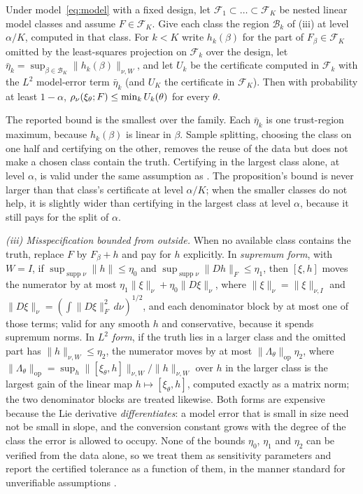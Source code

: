 \begin{proposition}
\label{prop:classes}
Under model~\eqref{eq:model} with a fixed design, let $\mathcal F_1 \subset
\dots \subset \mathcal F_K$ be nested linear model classes and assume $F \in
\mathcal F_K$. Give each class the region $\mathcal B_k$ of
(iii) at level $\alpha/K$, computed in that class. For $k < K$ write $h_k(\beta)$ for the part
of $F_\beta \in \mathcal F_K$ omitted by the least-squares projection on
$\mathcal F_k$ over the design, let $\bar\eta_k = \sup_{\beta \in \mathcal B_K}
\|h_k(\beta)\|_{\nu,W}$, and let $U_k$ be the certificate computed in
$\mathcal F_k$ with the $L^2$ model-error term $\bar\eta_k$ (and $U_K$ the
certificate in $\mathcal F_K$). Then with probability at least $1-\alpha$,
$\rho_\nu(\xi_\theta;F) \le \min_k U_k(\theta)$ for every $\theta$.
\end{proposition}

The reported bound is the smallest over the family. Each $\bar\eta_k$ is one
trust-region maximum, because $h_k(\beta)$ is linear in $\beta$. Sample
splitting, choosing the class on one half and certifying on the other, removes
the reuse of the data but does not make a chosen class contain the truth.
Certifying in the largest class alone, at level $\alpha$, is valid under the
same assumption as . The proposition's bound is never larger
than that class's certificate at level $\alpha/K$; when the smaller classes do
not help, it is slightly wider than certifying in the largest class at level
$\alpha$, because it still pays for the split of $\alpha$.

\emph{(iii) Misspecification bounded from outside.} When no available class
contains the truth, replace $F$ by $F_\beta + h$ and pay for $h$ explicitly. In
\emph{supremum form}, with $W = I$, if $\sup_{\operatorname{supp}\nu} \|h\| \le
\eta_0$ and $\sup_{\operatorname{supp}\nu}\|Dh\|_F \le \eta_1$, then $[\xi,h]$
moves the numerator by at most $\eta_1\|\xi\|_{\nu} + \eta_0\|D\xi\|_{\nu}$,
where $\|\xi\|_\nu = \|\xi\|_{\nu,I}$ and $\|D\xi\|_\nu = (\int
\|D\xi\|_F^2\,d\nu)^{1/2}$, and each denominator block by at most one of those
terms; valid for any smooth $h$ and conservative, because it spends supremum
norms. In \emph{$L^2$ form}, if the truth lies in a larger class and the
omitted part has $\|h\|_{\nu,W} \le \eta_2$, the numerator moves by at most
$\|\Lambda_\theta\|_{\mathrm{op}}\eta_2$, where $\|\Lambda_\theta\|_{\mathrm{op}}
= \sup_h \|[\xi_\theta,h]\|_{\nu,W}/\|h\|_{\nu,W}$ over $h$ in the larger class
is the largest gain of the linear map $h \mapsto [\xi_\theta,h]$, computed
exactly as a matrix norm; the two denominator blocks are treated likewise. Both forms are expensive
because the Lie derivative \emph{differentiates}: a model error that is small in
size need not be small in slope, and the conversion constant grows with the
degree of the class the error is allowed to occupy. None of the bounds
$\eta_0$, $\eta_1$ and $\eta_2$ can be verified from the data alone, so we
treat them as sensitivity parameters and report the certified tolerance as a
function of them, in the manner standard for
unverifiable assumptions \citep{rosenbaum2002observational}.

